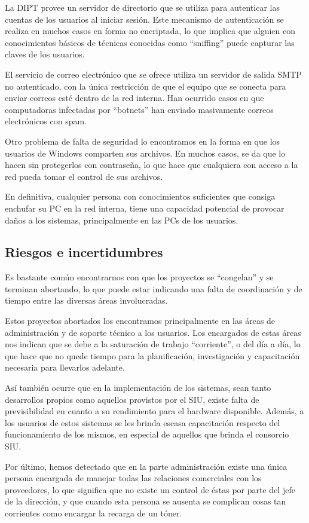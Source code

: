 \documentclass[a4paper,11pt,oneside]{article}
\begin{document}
La DIPT provee un servidor de directorio  que se utiliza
para autenticar las cuentas de los usuarios al iniciar sesión. Este
mecanismo de autenticación se realiza en muchos casos en forma no
encriptada, lo que implica que alguien con conocimientos básicos de
técnicas conocidas como ``sniffing'' puede capturar las claves de los
usuarios.

El servicio de correo electrónico que se ofrece utiliza un servidor de
salida SMTP no autenticado, con la única restricción de que el equipo
que se conecta para enviar correos esté dentro de la red interna. Han
ocurrido casos en que computadoras infectadas por ``botnets'' han
enviado masivamente correos electrónicos con spam.

Otro problema de falta de seguridad lo encontramos en la forma en que
los usuarios de Windows comparten sus archivos. En muchos casos, se da
que lo hacen sin protegerlos con contraseña, lo que hace que
cualquiera con acceso a la red pueda tomar el control de sus archivos.

En definitiva, cualquier persona con conocimientos suficientes que
consiga enchufar su PC en la red interna, tiene una capacidad
potencial de provocar daños a los sistemas, principalmente en las PCs
de los usuarios.
%
\subsection*{Riesgos e incertidumbres}
%
Es bastante común encontrarnos con que los proyectos se ``congelan'' y
se terminan abortando, lo que puede estar indicando una falta de
coordinación y de tiempo entre las diversas áreas involucradas.

Estos proyectos abortados los encontramos principalmente en las áreas
de administración y de soporte técnico a los usuarios. Los encargados
de estas áreas nos indican que se debe a la saturación de trabajo
``corriente'', o del día a día, lo que hace que no quede tiempo para
la planificación, investigación y capacitación necesaria para
llevarlos adelante.

Así también ocurre que en la implementación de los sistemas, sean
tanto desarrollos propios como aquellos provistos por el SIU, existe
falta de previsibilidad en cuanto a su rendimiento para el hardware
disponible. Además, a los usuarios de estos sistemas se les brinda
escasa capacitación respecto del funcionamiento de los mismos, en
especial de aquellos que brinda el consorcio SIU.

Por último, hemos detectado que en la parte administración existe una
única persona encargada de manejar todas las relaciones comerciales
con los proveedores, lo que significa que no existe un control de
éstas por parte del jefe de la dirección, y que cuando esta persona se
ausenta se complican cosas tan corrientes como encargar la recarga de
un tóner.
\end{document}
